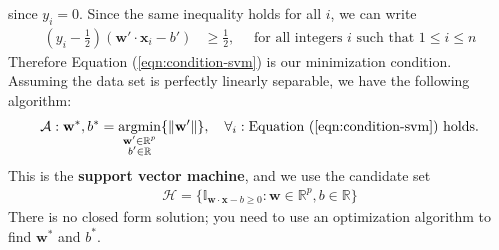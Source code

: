 \documentclass[12pt, a4paper]{article}
\theoremstyle{definition}
\begin{document}
	since $y_i=0$. Since the same inequality holds for all $i$, we can write
	\begin{align}
		\left(y_i-\frac{1}{2}\right)\left(\mathbf{w}'\cdot \mathbf{x}_i-b'\right)&\geq \frac{1}{2},\quad
		\text{ for all integers $i$ such that } 1\leq i\leq n
		\label{eqn:condition-svm}
	\end{align}
	Therefore Equation (\ref{eqn:condition-svm}) is our minimization condition.
	Assuming the data set is perfectly linearly separable, we have the following algorithm:
	\begin{align*}
		\mathcal{A}:\mathbf{w}^*, b^*=
		\underset{\substack{\mathbf{w}'\in\mathbb{R}^p \\b'\in\mathbb{R}}}{\text{argmin}}
		\{\|\mathbf{w}'\|\},\quad \forall_i:\text{Equation (\ref{eqn:condition-svm}) holds.}
	\end{align*}
	This is the \textbf{support vector machine}, and we use the candidate set
	\begin{align*}
		\mathcal{H}=\{\mathbb{I}_{\mathbf{w}\cdot\mathbf{x}-b\geq 0}:\mathbf{w}\in\mathbb{R}^p, b\in\mathbb{R}\}
	\end{align*}
	There is no closed form solution; you need to use an optimization algorithm to find
	$\mathbf{w}^*$ and $b^*$.
	
\end{document}
